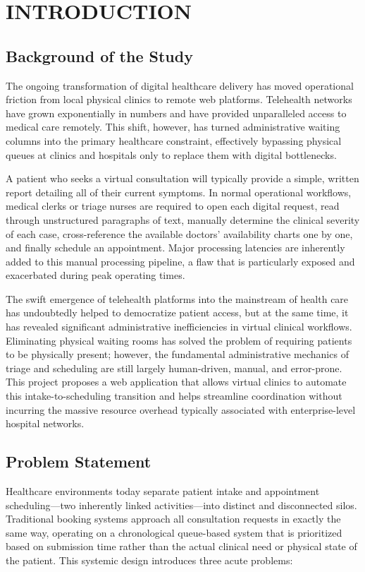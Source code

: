 \documentclass[12pt,a4paper]{report}
\begin{document}
\setcounter{chapter}{0}
\chapter{INTRODUCTION}

\section{Background of the Study}
The ongoing transformation of digital healthcare delivery has moved operational friction from local physical clinics to remote web platforms. Telehealth networks have grown exponentially in numbers and have provided unparalleled access to medical care remotely. This shift, however, has turned administrative waiting columns into the primary healthcare constraint, effectively bypassing physical queues at clinics and hospitals only to replace them with digital bottlenecks. 

A patient who seeks a virtual consultation will typically provide a simple, written report detailing all of their current symptoms. In normal operational workflows, medical clerks or triage nurses are required to open each digital request, read through unstructured paragraphs of text, manually determine the clinical severity of each case, cross-reference the available doctors' availability charts one by one, and finally schedule an appointment. Major processing latencies are inherently added to this manual processing pipeline, a flaw that is particularly exposed and exacerbated during peak operating times.

The swift emergence of telehealth platforms into the mainstream of health care has undoubtedly helped to democratize patient access, but at the same time, it has revealed significant administrative inefficiencies in virtual clinical workflows. Eliminating physical waiting rooms has solved the problem of requiring patients to be physically present; however, the fundamental administrative mechanics of triage and scheduling are still largely human-driven, manual, and error-prone. This project proposes a web application that allows virtual clinics to automate this intake-to-scheduling transition and helps streamline coordination without incurring the massive resource overhead typically associated with enterprise-level hospital networks.

\section{Problem Statement}
Healthcare environments today separate patient intake and appointment scheduling—two inherently linked activities—into distinct and disconnected silos. Traditional booking systems approach all consultation requests in exactly the same way, operating on a chronological queue-based system that is prioritized based on submission time rather than the actual clinical need or physical state of the patient. This systemic design introduces three acute problems:
\end{document}
